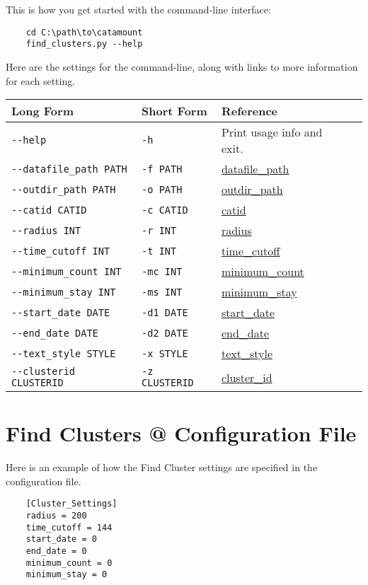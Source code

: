 This is how you get started with the command-line interface:

\begin{verbatim}
    cd C:\path\to\catamount
    find_clusters.py --help
\end{verbatim}

Here are the settings for the command-line, along with links
to more information for each setting.

\begin{table}[h]
\begin{tabular}{|l|l|l|l|}
  \hline
  Long Form & Short Form & Reference \\ \hline \hline

  \verb=--help= & \verb=-h= & Print usage info and exit. \\ \hline
  \verb=--datafile_path PATH= & \verb=-f PATH= & \hyperlink{global-datafile-path}{datafile\_path} \\ \hline
  \verb=--outdir_path PATH= & \verb=-o PATH= & \hyperlink{global-outdir-path}{outdir\_path} \\ \hline
  \verb=--catid CATID= & \verb=-c CATID= & \hyperlink{cluster-catid}{catid} \\ \hline
  \verb=--radius INT= & \verb=-r INT= & \hyperlink{cluster-radius}{radius} \\ \hline
  \verb=--time_cutoff INT= & \verb=-t INT= & \hyperlink{cluster-time-cutoff}{time\_cutoff} \\ \hline
  \verb=--minimum_count INT= & \verb=-mc INT= & \hyperlink{cluster-minimum-count}{minimum\_count} \\ \hline
  \verb=--minimum_stay INT= & \verb=-ms INT= & \hyperlink{cluster-minimum-stay}{minimum\_stay} \\ \hline
  \verb=--start_date DATE= & \verb=-d1 DATE= & \hyperlink{cluster-start-date}{start\_date} \\ \hline
  \verb=--end_date DATE= & \verb=-d2 DATE= & \hyperlink{cluster-end-date}{end\_date} \\ \hline
  \verb=--text_style STYLE= & \verb=-x STYLE= & \hyperlink{cluster-text-style}{text\_style} \\ \hline
  \verb=--clusterid CLUSTERID= & \verb=-z CLUSTERID= & \hyperlink{cluster-clusterid}{cluster\_id} \\ \hline

\end{tabular}
\end{table}

\FloatBarrier

\section{Find Clusters @ Configuration File}

Here is an example of how the Find Cluster settings are specified
in the configuration file.

\begin{verbatim}
    [Cluster_Settings]
    radius = 200
    time_cutoff = 144
    start_date = 0
    end_date = 0
    minimum_count = 0
    minimum_stay = 0
\end{verbatim}
